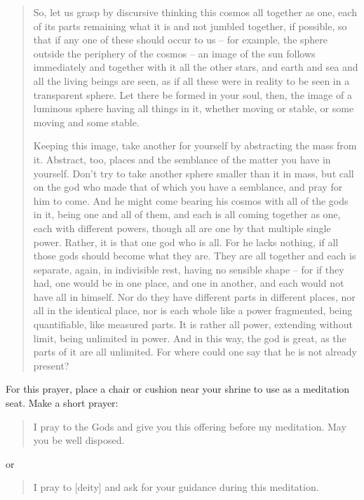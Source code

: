 \documentclass[
]{book}
\begin{document}
\begin{quote}
So, let us grasp by discursive thinking this cosmos all together as one, each of its parts remaining what it is and not jumbled together, if possible, so that if any one of these should occur to us -- for example, the sphere outside the periphery of the cosmos -- an image of the sun follows immediately and together with it all the other stars, and earth and sea and all the living beings are seen, as if all these were in reality to be seen in a transparent sphere. Let there be formed in your soul, then, the image of a luminous sphere having all things in it, whether moving or stable, or some moving and some stable.

Keeping this image, take another for yourself by abstracting the mass from it. Abstract, too, places and the semblance of the matter you have in yourself. Don't try to take another sphere smaller than it in mass, but call on the god who made that of which you have a semblance, and pray for him to come. And he might come bearing his cosmos with all of the gods in it, being one and all of them, and each is all coming together as one, each with different powers, though all are one by that multiple single power. Rather, it is that one god who is all. For he lacks nothing, if all those gods should become what they are. They are all together and each is separate, again, in indivisible rest, having no sensible shape -- for if they had, one would be in one place, and one in another, and each would not have all in himself. Nor do they have different parts in different places, nor all in the identical place, nor is each whole like a power fragmented, being quantifiable, like measured parts. It is rather all power, extending without limit, being unlimited in power. And in this way, the god is great, as the parts of it are all unlimited. For where could one say that he is not already present?
\end{quote}

For this prayer, place a chair or cushion near your shrine to use as a meditation seat. Make a short prayer:

\begin{quote}
I pray to the Gods and give you this offering before my meditation. May you be well disposed.
\end{quote}

or

\begin{quote}
I pray to {[}deity{]} and ask for your guidance during this meditation.
\end{quote}
\end{document}

